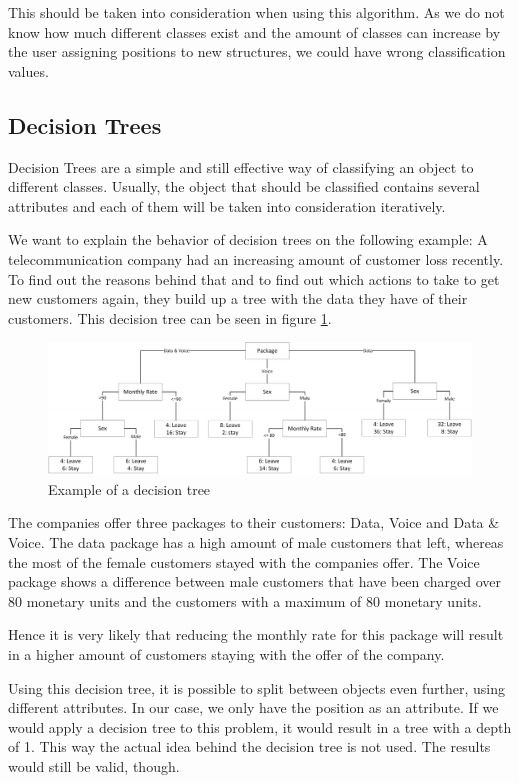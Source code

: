 This should be taken into consideration when using this algorithm. As we do not know how much different classes exist and the amount of classes can increase by the user assigning positions to new structures, we could have wrong classification values.

\subsection{Decision Trees}
\label{sec4.2.2}
Decision Trees are a simple and still effective way of classifying an object to different classes. Usually, the object that should be classified contains several attributes and each of them will be taken into consideration iteratively.

We want to explain the behavior of decision trees on the following example: 
A telecommunication company had an increasing amount of customer loss recently. To find out the reasons behind that and to find out which actions to take to get new customers again, they build up a tree with the data they have of their customers. This decision tree can be seen in figure \ref{decisionTreeExample}.

\begin{figure}[ht!]
\centering
\includegraphics[width=\textwidth,natwidth=244,natheight=76]{Images/ML/DecisionTreeExample.pdf}
\caption{Example of a decision tree \label{decisionTreeExample}}
\end{figure}

The companies offer three packages to their customers: Data, Voice and Data \& Voice. The data package has a high amount of male customers that left, whereas the most of the female customers stayed with the companies offer. The Voice package shows a difference between male customers that have been charged over 80 monetary units and the customers with a maximum of 80 monetary units.

Hence it is very likely that reducing the monthly rate for this package will result in a higher amount of customers staying with the offer of the company.

Using this decision tree, it is possible to split between objects even further, using different attributes. In our case, we only have the position as an attribute. If we would apply a decision tree to this problem, it would result in a tree with a depth of 1. This way the actual idea behind the decision tree is not used. The results would still be valid, though.

